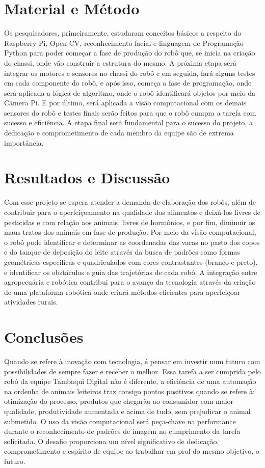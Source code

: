 \documentclass[article,12pt,onesidea,4paper,english,brazil]{abntex2}
\begin{document}
	\section*{Material e Método}
	
	Os pesquisadores, primeiramente, estudaram conceitos básicos a respeito do Raspberry Pi, Open CV, reconhecimento facial e linguagem de Programação Python para poder começar a fase de produção do robô que, se inicia na criação do chassi, onde vão construir a estrutura do mesmo. A próxima etapa será integrar os motores e sensores no chassi do robô e em seguida, fará alguns testes em cada componente do robô, e após isso, começa a fase de programação, onde será aplicada a lógica de algoritmo, onde o robô identificará objetos por meio da Câmera Pi. E por último, será aplicada a visão computacional com os demais sensores do robô e testes finais serão feitos para que o robô cumpra a tarefa com sucesso e eficiência. A etapa final será fundamental para o sucesso do projeto, a dedicação e comprometimento de cada membro da equipe são de extrema importância.
	
	\section*{Resultados e Discussão}
	
	Com esse projeto se espera atender a demanda de elaboração dos robôs, além de contribuir para o aperfeiçoamento na qualidade dos alimentos e deixá-los livres de pesticidas e com relação aos animais, livres de hormônios, e por fim, diminuir os maus tratos dos animais em fase de produção. Por meio da visão computacional, o robô pode identificar e determinar as coordenadas das vacas no pasto dos copos e do tanque de deposição do leite através da busca de padrões como formas geométricas especificas e quadriculados com cores contrastantes (branco e preto), e identificar os obstáculos e guia das trajetórias de cada robô. A integração entre agropecuária e robótica contribui para o avanço da tecnologia através da criação de uma plataforma robótica onde criará métodos eficientes para aperfeiçoar atividades rurais.
	
	\section*{Conclusões}
	
Quando se refere à inovação com tecnologia, é pensar em investir num futuro com possibilidades de sempre fazer e receber o melhor. Essa tarefa a ser cumprida pelo robô da equipe Tambaqui Digital não é diferente, a eficiência de uma automação na ordenha de animais leiteiros traz consigo pontos positivos quando se refere à: otimização do processo, produtos que chegarão ao consumidor com maior qualidade, produtividade aumentada e acima de tudo, sem prejudicar o animal submetido. O uso da visão computacional será peça-chave na performance durante o reconhecimento de padrões de imagem no cumprimento da tarefa solicitada. O desafio proporciona um nível significativo de dedicação, comprometimento e espírito de equipe ao trabalhar em prol do mesmo objetivo, o futuro.
\end{document}

